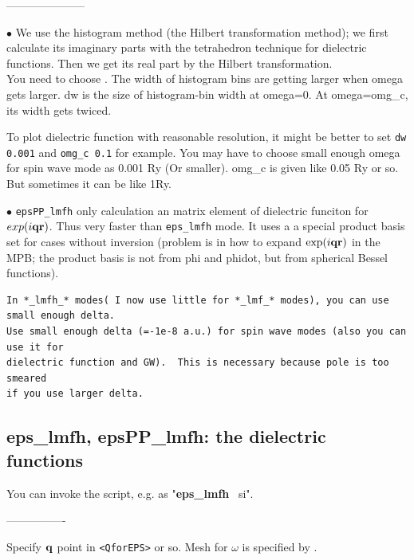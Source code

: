 \documentclass[a4paper,10pt,epsf,fleqn]{article}
\newcommand{\keyw}[1]{\fbox{\tt #1}}
\newcommand{\bfq}{{\bf q}}
\newcommand{\bfr}{{\bf r}}
\newcommand{\exe}[1]{{\bf #1}\index{#1}}
\newcommand{\raw}[1]{{\tt #1}}
\begin{document}
---------------------

\noindent $\bullet$ We use the histogram method (the Hilbert
transformation method); we first calculate its imaginary parts
  with the tetrahedron technique for dielectric functions. 
  Then we get its real part by the Hilbert transformation.\\
  You need to choose \keyw{dw,omg\_c}. 
  The width of histogram bins are getting larger when omega gets larger.
  dw is the size of histogram-bin width at omega=0. 
  At omega=omg\_c, its width gets twiced.

  To plot dielectric function with reasonable resolution, it might be
  better to set \verb#dw 0.001# and \verb#omg_c 0.1# for example.
  You may have to choose small enough omega 
  for spin wave mode as 0.001 Ry (Or smaller).
  omg\_c is given like 0.05 Ry or so. But sometimes it can be like 1Ry.

  
\noindent $\bullet$ \raw{epsPP\_lmfh} only calculation an matrix element 
  of dielectric funciton for $exp(i \bfq \bfr)$. Thus very faster 
  than \raw{eps\_lmfh} mode. 
  It uses a a special product basis set for cases without inversion
  (problem is in how to expand $\exp(i \bfq \bfr)$ in the MPB;
   the product basis is not from phi and phidot, 
    but from spherical Bessel functions).\\



\begin{verbatim}
In *_lmfh_* modes( I now use little for *_lmf_* modes), you can use small enough delta.
Use small enough delta (=-1e-8 a.u.) for spin wave modes (also you can use it for 
dielectric function and GW).  This is necessary because pole is too smeared 
if you use larger delta.
\end{verbatim}



\subsection{eps\_lmfh, epsPP\_lmfh: the dielectric functions}

You can invoke the script, e.g. as "\exe{eps\_lmfh} \ si".

----------------

Specify ${\bf q}$ point in \verb#<QforEPS># or so.
Mesh for $\omega$ is specified by \keyw{dw, omg\_c}.
\end{document}
